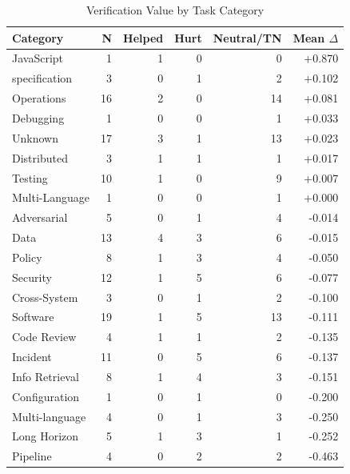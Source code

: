 \begin{table}[h]
\centering
\caption{Verification Value by Task Category}
\label{tab:verification_by_category}
\begin{tabular}{lrrrrr}
\toprule
\textbf{Category} & \textbf{N} & \textbf{Helped} & \textbf{Hurt} & \textbf{Neutral/TN} & \textbf{Mean $\Delta$} \\
\midrule
JavaScript & 1 & 1 & 0 & 0 & +0.870 \\
specification & 3 & 0 & 1 & 2 & +0.102 \\
Operations & 16 & 2 & 0 & 14 & +0.081 \\
Debugging & 1 & 0 & 0 & 1 & +0.033 \\
Unknown & 17 & 3 & 1 & 13 & +0.023 \\
Distributed & 3 & 1 & 1 & 1 & +0.017 \\
Testing & 10 & 1 & 0 & 9 & +0.007 \\
Multi-Language & 1 & 0 & 0 & 1 & +0.000 \\
Adversarial & 5 & 0 & 1 & 4 & -0.014 \\
Data & 13 & 4 & 3 & 6 & -0.015 \\
Policy & 8 & 1 & 3 & 4 & -0.050 \\
Security & 12 & 1 & 5 & 6 & -0.077 \\
Cross-System & 3 & 0 & 1 & 2 & -0.100 \\
Software & 19 & 1 & 5 & 13 & -0.111 \\
Code Review & 4 & 1 & 1 & 2 & -0.135 \\
Incident & 11 & 0 & 5 & 6 & -0.137 \\
Info Retrieval & 8 & 1 & 4 & 3 & -0.151 \\
Configuration & 1 & 0 & 1 & 0 & -0.200 \\
Multi-language & 4 & 0 & 1 & 3 & -0.250 \\
Long Horizon & 5 & 1 & 3 & 1 & -0.252 \\
Pipeline & 4 & 0 & 2 & 2 & -0.463 \\
\bottomrule
\end{tabular}
\end{table}
